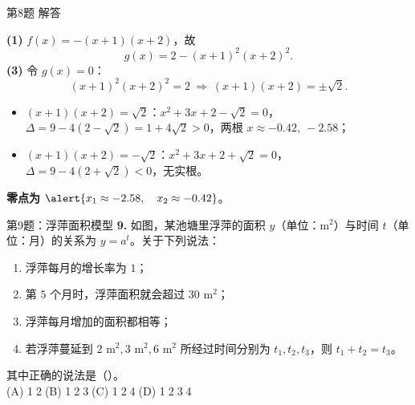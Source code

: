 \documentclass[10pt,aspectratio=169,serif]{beamer}
\begin{document}
\begin{frame}[t]{第8题 解答}
\begin{tcolorbox}[colback=orange!10,colframe=orange,title=\textbf{解}]
\textbf{(1)} $f(x)=-(x+1)(x+2)$，故
\[
g(x)=2-(x+1)^{2}(x+2)^{2}.
\]
\smallskip
\textbf{(3)} 令 $g(x)=0$：
\[
(x+1)^{2}(x+2)^{2}=2\ \Rightarrow\ (x+1)(x+2)=\pm\sqrt{2}.
\]
\begin{itemize}
  \item $(x+1)(x+2)=\sqrt{2}$：$x^{2}+3x+2-\sqrt{2}=0$，$\Delta=9-4(2-\sqrt{2})=1+4\sqrt{2}>0$，两根 $x\approx -0.42,\ -2.58$；
  \item $(x+1)(x+2)=-\sqrt{2}$：$x^{2}+3x+2+\sqrt{2}=0$，$\Delta=9-4(2+\sqrt{2})<0$，无实根。
\end{itemize}
\textbf{零点为 } $\alert{x_{1}\approx -2.58,\quad x_{2}\approx -0.42}$。
\end{tcolorbox}
\end{frame}

\begin{frame}[t]{第9题：浮萍面积模型}
\textbf{9.} 如图，某池塘里浮萍的面积 $y$（单位：$\text{m}^{2}$）与时间 $t$（单位：月）的关系为 $y=a^{t}$。关于下列说法：
\begin{center}
\end{center}
\begin{enumerate}
  \item 浮萍每月的增长率为 $1$；
  \item 第 $5$ 个月时，浮萍面积就会超过 $30\text{ m}^{2}$；
  \item 浮萍每月增加的面积都相等；
  \item 若浮萍蔓延到 $2\text{ m}^{2},3\text{ m}^{2},6\text{ m}^{2}$ 所经过时间分别为 $t_{1},t_{2},t_{3}$，则 $t_{1}+t_{2}=t_{3}$。
\end{enumerate}
其中正确的说法是（\quad）。\\
(A) \textcircled{1}\textcircled{2}\quad (B) \textcircled{1}\textcircled{2}\textcircled{3}\quad (C) \textcircled{1}\textcircled{2}\textcircled{4}\quad (D) \textcircled{1}\textcircled{2}\textcircled{3}\textcircled{4}
\end{frame}
\end{document}
